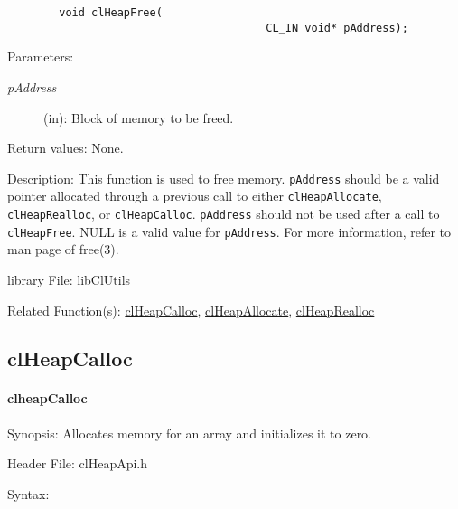 \begin{flushleft}
\begin{Desc}
\footnotesize\begin{verbatim}        void clHeapFree(
                                   		CL_IN void* pAddress);
\end{verbatim}
\normalsize
\end{Desc}
\begin{Desc}
\item[Parameters:]
\begin{description}
\item[{\em pAddress}](in): Block of memory to be freed.
\end{description}
\end{Desc}
\begin{Desc}
\item[Return values:]
None.
\end{Desc}
\begin{Desc}
\item[Description:]This function is used to free memory. {\tt{pAddress}} should be a valid pointer allocated through a previous call to either
{\tt{clHeapAllocate}}, {\tt{clHeapRealloc}}, or
{\tt{clHeapCalloc}}. {\tt{pAddress}} should not be used after a
call to {\tt{clHeapFree}}. NULL is a valid value for
{\tt{pAddress}}. For more information, refer to man page of
free(3).\end{Desc}
\begin{Desc}
\item[library File:]lib\-Cl\-Utils\end{Desc}
\begin{Desc}
\item[Related Function(s):]\hyperlink{pageheap130}{clHeapCalloc}, \hyperlink{pageheap128}{clHeapAllocate},
\hyperlink{pageheap105}{clHeapRealloc} \end{Desc}
\newpage



\subsection{clHeapCalloc}
\hypertarget{pageheap130}{}\paragraph{cl\-heap\-Calloc}\label{pageheap130}
\begin{Desc}
\item[Synopsis:]Allocates memory for an array and initializes it to zero.\end{Desc}
\begin{Desc}
\item[Header File:]clHeapApi.h\end{Desc}
\begin{Desc}
\item[Syntax:]


\end{Desc}
\end{flushleft}
